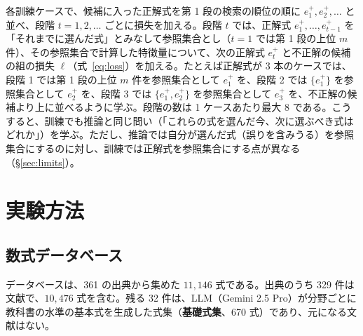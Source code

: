 \documentclass[11pt,a4paper]{ltjsarticle}
\begin{document}
各訓練ケースで、候補に入った正解式を第 1 段の検索の順位の順に $e^+_1, e^+_2, \dots$ と並べ、段階 $t = 1, 2, \dots$ ごとに損失を加える。段階 $t$ では、正解式 $e^+_1, \dots, e^+_{t-1}$ を「それまでに選んだ式」とみなして参照集合とし（$t = 1$ では第 1 段の上位 $m$ 件）、その参照集合で計算した特徴量について、次の正解式 $e^+_t$ と不正解の候補の組の損失 $\ell$（式~\eqref{eq:loss}）を加える。たとえば正解式が 3 本のケースでは、段階 1 では第 1 段の上位 $m$ 件を参照集合として $e^+_1$ を、段階 2 では $\{e^+_1\}$ を参照集合として $e^+_2$ を、段階 3 では $\{e^+_1, e^+_2\}$ を参照集合として $e^+_3$ を、不正解の候補より上に並べるように学ぶ。段階の数は 1 ケースあたり最大 8 である。こうすると、訓練でも推論と同じ問い（「これらの式を選んだ今、次に選ぶべき式はどれか」）を学ぶ。ただし、推論では自分が選んだ式（誤りを含みうる）を参照集合にするのに対し、訓練では正解式を参照集合にする点が異なる（\S\ref{sec:limits}）。

\section{実験方法}\label{sec:data}
\subsection{数式データベース}\label{sec:db}
データベースは、361 の出典から集めた $11{,}146$ 式である。出典のうち 329 件は文献で、$10{,}476$ 式を含む。残る 32 件は、LLM（Gemini 2.5 Pro）が分野ごとに教科書の水準の基本式を生成した式集（\textbf{基礎式集}、670 式）であり、元になる文献はない。
\end{document}
